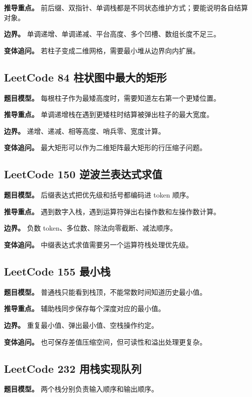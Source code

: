 \textbf{推导重点。} 前后缀、双指针、单调栈都是不同状态维护方式；要能说明各自结算对象。

\textbf{边界。} 单调递增、单调递减、平台高度、多个凹槽、数组长度不足三。

\textbf{变体追问。} 若柱子变成二维网格，需要最小堆从边界向内扩展。

\subsection{LeetCode 84 柱状图中最大的矩形}

\textbf{题目模型。} 每根柱子作为最矮高度时，需要知道左右第一个更矮位置。

\textbf{推导重点。} 单调递增栈在遇到更矮柱时结算被弹出柱子的最大宽度。

\textbf{边界。} 递增、递减、相等高度、哨兵零、宽度计算。

\textbf{变体追问。} 最大矩形可以作为二维矩阵最大矩形的行压缩子问题。

\subsection{LeetCode 150 逆波兰表达式求值}

\textbf{题目模型。} 后缀表达式把优先级和括号都编码进 token 顺序。

\textbf{推导重点。} 遇到数字入栈，遇到运算符弹出右操作数和左操作数计算。

\textbf{边界。} 负数 token、多位数、除法向零截断、减法顺序。

\textbf{变体追问。} 中缀表达式求值需要另一个运算符栈处理优先级。

\subsection{LeetCode 155 最小栈}

\textbf{题目模型。} 普通栈只能看到栈顶，不能常数时间知道历史最小值。

\textbf{推导重点。} 辅助栈同步保存每个深度对应的最小值。

\textbf{边界。} 重复最小值、弹出最小值、空栈操作约定。

\textbf{变体追问。} 也可保存差值压缩空间，但可读性和溢出处理更复杂。

\subsection{LeetCode 232 用栈实现队列}

\textbf{题目模型。} 两个栈分别负责输入顺序和输出顺序。

